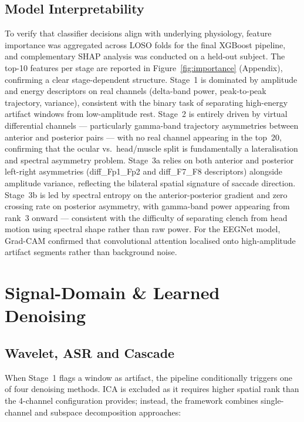 \documentclass[11pt,a4paper]{article}
\begin{document}
\subsection{Model Interpretability}
\label{sec:xai}
To verify that classifier decisions align with underlying physiology, feature importance was aggregated across LOSO folds for the final XGBoost pipeline, and complementary SHAP analysis was conducted on a held-out subject. The top-10 features per stage are reported in Figure~\ref{fig:importance} (Appendix), confirming a clear stage-dependent structure. Stage~1 is dominated by amplitude and energy descriptors on real channels (delta-band power, peak-to-peak trajectory, variance), consistent with the binary task of separating high-energy artifact windows from low-amplitude rest. Stage~2 is entirely driven by virtual differential channels — particularly gamma-band trajectory asymmetries between anterior and posterior pairs — with no real channel appearing in the top~20, confirming that the ocular vs.\ head/muscle split is fundamentally a lateralisation and spectral asymmetry problem. Stage~3a relies on both anterior and posterior left-right asymmetries (diff\_Fp1\_Fp2 and diff\_F7\_F8 descriptors) alongside amplitude variance, reflecting the bilateral spatial signature of saccade direction. Stage~3b is led by spectral entropy on the anterior-posterior gradient and zero crossing rate on posterior asymmetry, with gamma-band power appearing from rank~3 onward — consistent with the difficulty of separating clench from head motion using spectral shape rather than raw power. For the EEGNet model, Grad-CAM confirmed that convolutional attention localised onto high-amplitude artifact segments rather than background noise.

\section{Signal-Domain \& Learned Denoising}
\label{sec:denoising}

\subsection{Wavelet, ASR and Cascade}
When Stage~1 flags a window as artifact, the pipeline conditionally triggers one of four denoising methods. ICA is excluded as it requires higher spatial rank than the 4-channel configuration provides; instead, the framework combines single-channel and subspace decomposition approaches:
\end{document}
